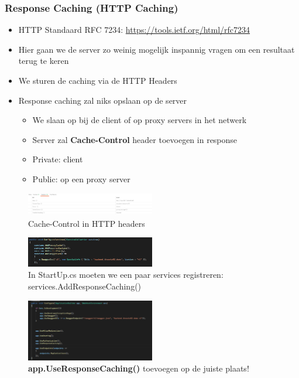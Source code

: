 \documentclass{article}
\begin{document}
\subsubsection{Response Caching (HTTP Caching)}

\begin{itemize}
    \item HTTP Standaard RFC 7234: \url{https://tools.ietf.org/html/rfc7234}
    \item Hier gaan we de server zo weinig mogelijk inspannig vragen om een resultaat terug te keren
    \item We sturen de caching via de HTTP Headers
    \item Response caching zal niks opslaan op de server
    \begin{itemize}
        \item We slaan op bij de client of op proxy servers in het netwerk
        \item Server zal \textbf{Cache-Control} header toevoegen in response
        \item Private: client
        \item Public: op een proxy server
    \end{itemize}
\end{itemize}

\begin{figure}[H]
    \centering
    \includegraphics[width=0.5\textwidth]{caching-response-caching.png}
    \caption{Cache-Control in HTTP headers}
\end{figure}

\begin{figure}[H]
    \centering
    \includegraphics[width=0.5\textwidth]{caching-response-werking.png}
    \caption{In StartUp.cs moeten we een paar services registreren: services.AddResponseCaching()}
\end{figure}

\begin{figure}[H]
    \centering
    \includegraphics[width=0.5\textwidth]{caching-response-werking2.png}
    \caption{\textbf{app.UseResponseCaching()} toevoegen op de juiste plaats!}
\end{figure}
\end{document}
